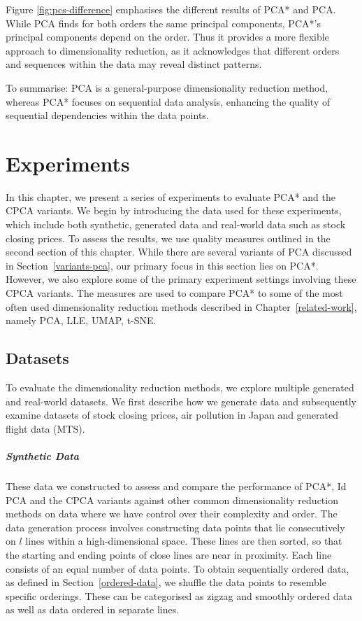 \documentclass[pdftex,12pt,a4paper]{report}
\begin{document}
Figure \ref{fig:pcs-difference} emphasises the different results of PCA* and PCA.
While PCA finds for both orders the same principal components, PCA*'s principal components depend on the order.
Thus it provides a more flexible approach to dimensionality reduction, as it acknowledges that different orders and sequences within the data may reveal distinct patterns.

To summarise: PCA is a general-purpose dimensionality reduction method, whereas PCA* focuses on sequential data analysis, enhancing the quality of sequential dependencies within the data points.


\chapter{Experiments}\label{experiments}
In this chapter, we present a series of experiments to evaluate PCA* and the CPCA variants.
We begin by introducing the data used for these experiments, which include both synthetic, generated data and real-world data such as stock closing prices.
To assess the results, we use quality measures outlined in the second section of this chapter.
While there are several variants of PCA discussed in Section~\ref{variants-pca}, our primary focus in this section lies on PCA*.
However, we also explore some of the primary experiment settings involving these CPCA variants.
The measures are used to compare PCA* to some of the most often used dimensionality reduction methods described in Chapter~\ref{related-work}, namely PCA, LLE, UMAP, t-SNE. 

\section{Datasets} \label{datasets}
To evaluate the dimensionality reduction methods, we explore multiple generated and real-world datasets.
We first describe how we generate data and subsequently examine datasets of stock closing prices, air pollution in Japan and generated flight data (MTS).

\paragraph{Synthetic Data} \label{generated_data}
These data we constructed to assess and compare the performance of PCA*, Id PCA and the CPCA variants against other common dimensionality reduction methods on data where we have control over their complexity and order.
The data generation process involves constructing data points that lie consecutively on $l$ lines within a high-dimensional space.
These lines are then sorted, so that the starting and ending points of close lines are near in proximity.
Each line consists of an equal number of data points.
To obtain sequentially ordered data, as defined in Section~\ref{ordered-data}, we shuffle the data points to resemble specific orderings.
These can be categorised as zigzag and smoothly ordered data as well as data ordered in separate lines.
\end{document}
